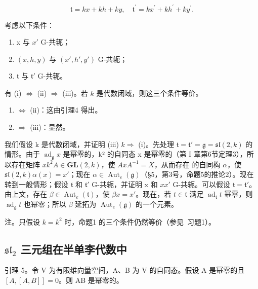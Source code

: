 \[
\mathfrak {t} = k x + k h + k y, \quad \mathfrak {t} ^ {\prime} = k x ^ {\prime} + k h ^ {\prime} + k y ^ {\prime}.
\]

考虑以下条件：

\begin{enumerate}
\def\labelenumi{(\roman{enumi})}
\item
  x 与 \(x'\) G-共轭；
\item
  \((x, h, y)\) 与 \((x', h', y')\) G-共轭；
\item
  \(\mathfrak{t}\) 与 \(\mathfrak{t}'\) G-共轭。
\end{enumerate}

有 (i) \(\Longleftrightarrow\) (ii) \(\Longrightarrow\) (iii)。若 \(k\) 是代数闭域，则这三个条件等价。

\begin{enumerate}
\def\labelenumi{(\roman{enumi})}
\item
  \(\Longleftrightarrow\) (ii)：这由引理4 得出。
\item
  \(\Longrightarrow\) (iii)：显然。
\end{enumerate}

我们假设 k 是代数闭域，并证明 (iii) \(k\)\(\Longrightarrow\) (i)。先处理 \(\mathfrak{t} = \mathfrak{t}' = \mathfrak{g} = \mathfrak{sl}(2, k)\) 的情形。由于 \(\operatorname{ad}_{\mathfrak{g}} x\) 是幂零的，k² 的自同态 x 是幂零的（第 I 章第6节定理3），所以存在矩阵 \(x\)\(k^2\)\(A \in \mathbf{GL}(2, k)\)，使 \(AxA^{-1} = X\)，从而存在  的自同构 \(\alpha\)，使 \(\mathfrak{sl}(2, k)\)\(\alpha(x) = x'\)；现在 \(\alpha \in \operatorname{Aut}_e(\mathfrak{g})\)（§5，第3号，命题5的推论2）。现在转到一般情形；假设 \(\mathfrak{t}\) 和 \(\mathfrak{t}'\) G-共轭，并证明 x 和 \(x\)\(x'\) G-共轭。可以假设 \(\mathfrak{t} = \mathfrak{t}'\)。由上文，存在 \(\beta \in \operatorname{Aut}_e(\mathfrak{t})\)，使 \(\beta x = x'\)。现在，若 \(t \in \mathfrak{t}\) 满足 \(\operatorname{ad}_{\mathfrak{t}} t\) 幂零，则 \(\operatorname{ad}_{\mathfrak{g}} t\) 也幂零；所以 \(\beta\) 延拓为 \(\operatorname{Aut}_e(\mathfrak{g})\) 的一个元素。

注。只假设 \(k = k^2\) 时，命题1 的三个条件仍然等价（参见~习题1）。

\subsection{\texorpdfstring{\(\mathfrak{sl}_2\) 三元组在半单李代数中}{\textbackslash mathfrak\{sl\}\_2 三元组在半单李代数中}}

引理 5。令 V 为有限维向量空间，A、B 为 V 的自同态。假设 A 是幂零的且 \([A, [A, B]] = 0\)。则 AB 是幂零的。

